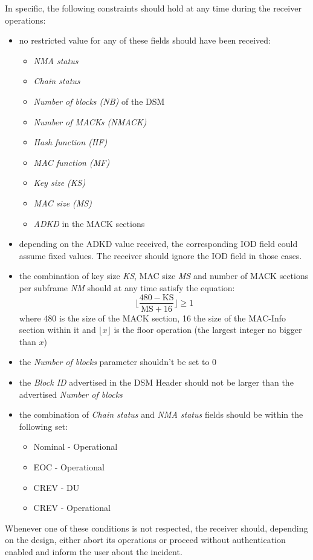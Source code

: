 In specific, the following constraints should hold at any time during the
receiver operations:
\begin{itemize}
  \item no restricted value for any of these fields should have been received:
    \begin{itemize}
      \item \textit{NMA status}
      \item \textit{Chain status}
      \item \textit{Number of blocks (NB)} of the DSM
      \item \textit{Number of MACKs (NMACK)}
      \item \textit{Hash function (HF)}
      \item \textit{MAC function (MF)}
      \item \textit{Key size (KS)}
      \item \textit{MAC size (MS)}
      \item \textit{ADKD} in the MACK sections
    \end{itemize}
  \item depending on the ADKD value received, the corresponding IOD field could
    assume fixed values. The receiver should ignore the IOD field in those cases.
  \item the combination of key size \textit{KS}, MAC size \textit{MS} and number
    of MACK sections per subframe \textit{NM} should at any time satisfy the
    equation:
    \[
      \Big\lfloor \frac{480 - \textrm{KS}}{\textrm{MS} + 16} \Big\rfloor \geq 1
    \]
    where \num{480} is the size of the MACK section, \num{16} the size of the
    MAC-Info section within it and $\lfloor x \rfloor$ is the floor
    operation (the largest integer no bigger than $x$)
  \item the \textit{Number of blocks} parameter shouldn't be set to \num{0}
  \item the \textit{Block ID} advertised in the DSM Header should not be larger
    than the advertised \textit{Number of blocks}
  \item the combination of \textit{Chain status} and \textit{NMA status} fields
    should be within the following set:
    \begin{itemize}
      \item Nominal - Operational
      \item EOC - Operational
      \item CREV - DU
      \item CREV - Operational
    \end{itemize}
\end{itemize}
Whenever one of these conditions is not respected, the receiver should,
depending on the design, either abort its operations or proceed without
authentication enabled and inform the user about the incident.

